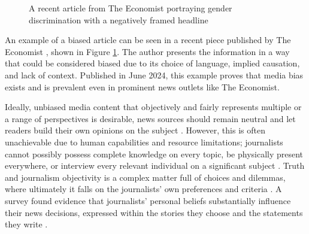 \begin{figure}[htbp]
    \centering
    \caption{A recent article from The Economist \cite{economist-2024-incels} portraying gender discrimination with a negatively framed headline}
    \label{fig:the-economist-biased-article}
\end{figure}

An example of a biased article can be seen in a recent piece published by The Economist \cite{economist-2024-incels}, shown in Figure \ref{fig:the-economist-biased-article}. The author presents the information in a way that could be considered biased due to its choice of language, implied causation, and lack of context. Published in June 2024, this example proves that media bias exists and is prevalent even in prominent news outlets like The Economist.

Ideally, unbiased media content that objectively and fairly represents multiple or a range of perspectives is desirable, news sources should remain neutral and let readers build their own opinions on the subject \cite{reuters-2021-digital-news-report}. However, this is often unachievable due to human capabilities and resource limitations; journalists cannot possibly possess complete knowledge on every topic, be physically present everywhere, or interview every relevant individual on a significant subject \cite{allsides-2022-bias-definition}. Truth and journalism objectivity is a complex matter full of choices and dilemmas, where ultimately it falls on the journalists' own preferences and criteria \cite{boudana-2011-journalistic-objectivity}. A survey found evidence that journalists' personal beliefs substantially influence their news decisions, expressed within the stories they choose and the statements they write \cite{patterson-donsbach-1996-news-decisions}.

